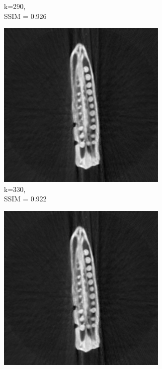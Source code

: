 \documentclass[journal]{IEEEtran}
\begin{document}
\begin{figure}[h]
\begin{subfigure}[b]{0.24\linewidth}
        \caption{k=290,\\ SSIM = 0.926}
     \end{subfigure}
  \begin{subfigure}[b]{0.24\linewidth}
        \includegraphics[width=\textwidth]{../images/okra/2D_okra/weighted_pca330.png}
        \caption{k=330,\\ SSIM = 0.922}
     \end{subfigure}
   \begin{subfigure}[b]{0.24\linewidth}
        \includegraphics[width=\textwidth]{../images/okra/2D_okra/weighted_pca370.png}

\end{subfigure}
\end{figure}
\end{document}
